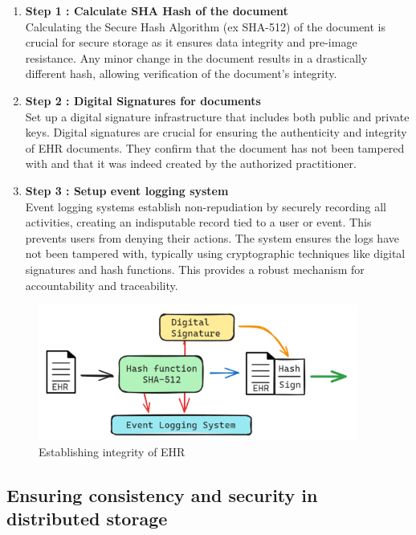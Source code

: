 \documentclass[runningheads]{llncs}
\begin{document}
\begin{enumerate} 

    \item  \textbf{Step 1 : Calculate SHA Hash of the document} \\ 
    Calculating the Secure Hash Algorithm (ex SHA-512) of the document is crucial for secure storage as it ensures data integrity and pre-image resistance. Any minor change in the document results in a drastically different hash, allowing verification of the document’s integrity.
    \item \textbf{Step 2 : Digital Signatures for documents} \\ 
    Set up a digital signature infrastructure that includes both public and private keys. Digital signatures are crucial for ensuring the authenticity and integrity of EHR documents. They confirm that the document has not been tampered with and that it was indeed created by the authorized practitioner.
    \item \textbf{Step 3 : Setup event logging system} \\ 
    Event logging systems establish non-repudiation by securely recording all activities, creating an indisputable record tied to a user or event. This prevents users from denying their actions. The system ensures the logs have not been tampered with, typically using cryptographic techniques like digital signatures and hash functions. This provides a robust mechanism for accountability and traceability.
\end{enumerate}

\vspace{-0.5cm}

\begin{figure}
\centerline{\includegraphics{img/step1.png}}
\caption{Establishing integrity of EHR}
\label{fig}
\end{figure}

\subsection{Ensuring consistency and security in distributed storage}
\end{document}
